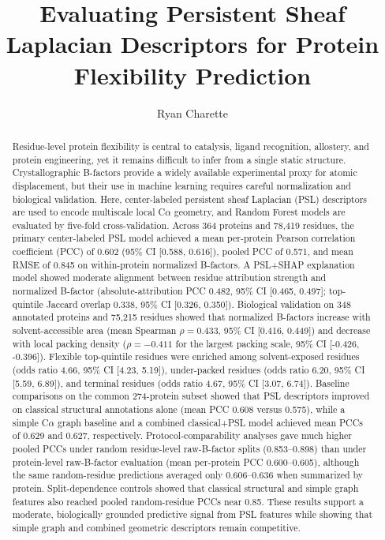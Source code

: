 \documentclass[11pt]{article}
\title{Evaluating Persistent Sheaf Laplacian Descriptors for Protein Flexibility Prediction}
\author{Ryan Charette}
\date{}
\newcommand{\calpha}{C\ensuremath{\alpha}\xspace}
\begin{document}
\maketitle

\begin{abstract}
Residue-level protein flexibility is central to catalysis, ligand recognition, allostery, and protein engineering, yet it remains difficult to infer from a single static structure. Crystallographic B-factors provide a widely available experimental proxy for atomic displacement, but their use in machine learning requires careful normalization and biological validation. Here, center-labeled persistent sheaf Laplacian (PSL) descriptors are used to encode multiscale local \calpha geometry, and Random Forest models are evaluated by five-fold cross-validation. Across 364 proteins and 78,419 residues, the primary center-labeled PSL model achieved a mean per-protein Pearson correlation coefficient (PCC) of 0.602 (95\% CI [0.588, 0.616]), pooled PCC of 0.571, and mean RMSE of 0.845 on within-protein normalized B-factors. A PSL+SHAP explanation model showed moderate alignment between residue attribution strength and normalized B-factor (absolute-attribution PCC 0.482, 95\% CI [0.465, 0.497]; top-quintile Jaccard overlap 0.338, 95\% CI [0.326, 0.350]). Biological validation on 348 annotated proteins and 75,215 residues showed that normalized B-factors increase with solvent-accessible area (mean Spearman $\rho=0.433$, 95\% CI [0.416, 0.449]) and decrease with local packing density ($\rho=-0.411$ for the largest packing scale, 95\% CI [-0.426, -0.396]). Flexible top-quintile residues were enriched among solvent-exposed residues (odds ratio 4.66, 95\% CI [4.23, 5.19]), under-packed residues (odds ratio 6.20, 95\% CI [5.59, 6.89]), and terminal residues (odds ratio 4.67, 95\% CI [3.07, 6.74]). Baseline comparisons on the common 274-protein subset showed that PSL descriptors improved on classical structural annotations alone (mean PCC 0.608 versus 0.575), while a simple \calpha graph baseline and a combined classical+PSL model achieved mean PCCs of 0.629 and 0.627, respectively. Protocol-comparability analyses gave much higher pooled PCCs under random residue-level raw-B-factor splits (0.853--0.898) than under protein-level raw-B-factor evaluation (mean per-protein PCC 0.600--0.605), although the same random-residue predictions averaged only 0.606--0.636 when summarized by protein. Split-dependence controls showed that classical structural and simple graph features also reached pooled random-residue PCCs near 0.85. These results support a moderate, biologically grounded predictive signal  from PSL features while showing that simple graph and combined geometric descriptors remain competitive.
\end{abstract}
\end{document}
